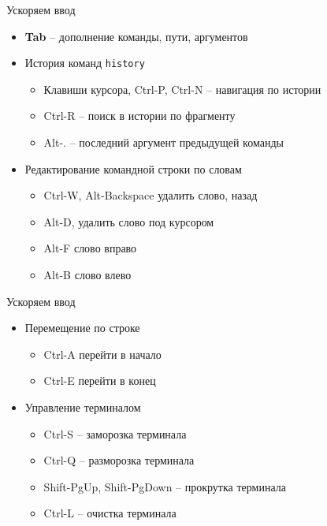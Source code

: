 \begin{frame}{Ускоряем ввод}
  \begin{itemize}
    \item \textbf{Tab} -- дополнение команды, пути, аргументов
      \pause
    \item История команд \alert{{\tt history}}
      \begin{itemize}
        \item Клавиши курсора, \alert{Ctrl-P}, Ctrl-N -- навигация по истории
        \item \alert{Ctrl-R} -- поиск в истории по фрагменту
        \item \alert{Alt-.}  -- последний аргумент предыдущей команды
      \end{itemize}
      \pause
    \item Редактирование командной строки по словам
      \begin{itemize}
        \item \alert{Ctrl-W}, \alert{Alt-Backspace} удалить слово, назад
        \item \alert{Alt-D}, удалить слово под курсором 
        \item \alert{Alt-F} слово вправо
        \item \alert{Alt-B} слово влево
      \end{itemize}
      \pause
  \end{itemize}
\end{frame}

\begin{frame}{Ускоряем ввод}
  \begin{itemize}
    \item Перемещение по строке
      \begin{itemize}
        \item \alert{Ctrl-A} перейти в начало 
        \item \alert{Ctrl-E} перейти в конец
      \end{itemize}
      \pause
    \item Управление терминалом
      \begin{itemize}
        \item Ctrl-S -- заморозка терминала
        \item Ctrl-Q -- разморозка терминала
        \item \alert{Shift-PgUp}, \alert{Shift-PgDown} -- прокрутка терминала
        \item \alert{Ctrl-L} -- очистка терминала
      \end{itemize}
  \end{itemize}
\end{frame}


